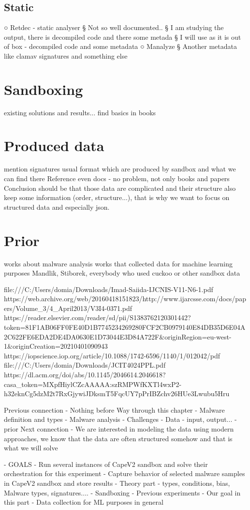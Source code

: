 \subsection{Static}
○ Retdec - static analyser
§ Not so well documented..
§ I am studying the output, there is decompiled code and there some metada
§ I will use as it is out of box - decompiled code and some metadata
○ Manalyze
§ Another metadata like clamav signatures and something else


\section{Sandboxing}
existing solutions and results...
find basics in books


\section{Produced data}
mention signatures
usual format which are produced by sandbox and what we can find there
Reference even docs - no problem, not only books and papers
Conclusion should be that those data are complicated and their structure also keep some information (order, structure...), that is why we want to focus on structured data and especially json.


\section{Prior}
works about malware analysis
works that collected data for machine learning purposes
Mandlik, Stiborek, everybody who used cuckoo or other sandbox data

file:///C:/Users/domia/Downloads/Imad-Saiida-IJCNIS-V11-N6-1.pdf
https://web.archive.org/web/20160418151823/http://www.ijarcsse.com/docs/papers/Volume_3/4_April2013/V3I4-0371.pdf
https://reader.elsevier.com/reader/sd/pii/S1383762120301442?token=81F1AB06FF0FE40D1B7745234269280FCF2CB0979140E84DB35D6E04A2C622FE6EDA2DE4DA0630E1D73044E3D84A722F&originRegion=eu-west-1&originCreation=20210401090943
https://iopscience.iop.org/article/10.1088/1742-6596/1140/1/012042/pdf
file:///C:/Users/domia/Downloads/JCIT4024PPL.pdf
https://dl.acm.org/doi/abs/10.1145/2046614.2046618?casa_token=MXpfHiylCZcAAAAA:szRMPWfKXTl4wxP2-h32eknCg5dzM2t7RxGjywiJDksmT5FqcUY7pPrIBZchv26HUe3Lwubu5Hru




Previous connection
- Nothing before
Way through this chapter
- Malware definition and types
- Malware analysis
- Challenges
- Data - input, output...
- prior
Next connection
- We are interested in modeling the data using modern approaches, we know that the data are often structured somehow and that is what we will solve

- GOALS
  - Run several instances of CapeV2 sandbox and solve their orchestration for this experiment
  - Capture behavior of selected malware samples in CapeV2 sandbox and store results
- Theory part - types, conditions, bias, Malware types, signatures....
- Sandboxing
- Previous experiments
- Our goal in this part
- Data collection for ML purposes in general